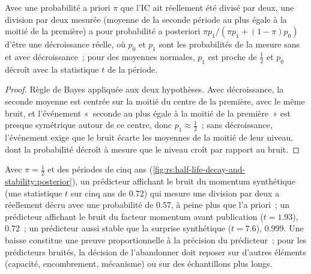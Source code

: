 \begin{proposition}\label{prop:rs:half-life-decay-and-stability:power}
Avec une probabilité a priori $\pi$ que l'IC ait réellement été divisé par deux, une division par deux mesurée (moyenne de la seconde période au plus égale à la moitié de la première) a pour probabilité a posteriori
$\pi p_1/(\pi p_1 + (1 - \pi)p_0)$ d'être une décroissance réelle, où $p_0$ et $p_1$ sont les probabilités de la mesure sans et avec décroissance~; pour des
moyennes normales, $p_1$ est proche de $\frac12$ et $p_0$ décroît avec la statistique $t$ de la période.
\end{proposition}

\begin{proof}
Règle de Bayes appliquée aux deux hypothèses. Avec décroissance, la seconde moyenne est centrée sur la moitié du centre de la première, avec le même bruit, et l'événement
«~seconde au plus égale à la moitié de la première~» est presque symétrique autour de ce centre, donc $p_1 \approx \frac12$~; sans décroissance, l'événement exige que le bruit
écarte les moyennes de la moitié de leur niveau, dont la probabilité décroît à mesure que le niveau croît par rapport au bruit.
\end{proof}

Avec $\pi = \frac12$ et des périodes de cinq ans (\cref{fig:rs:half-life-decay-and-stability:posterior}), un prédicteur affichant le bruit du momentum synthétique
(une statistique $t$ sur cinq ans de 0.72) qui mesure une division par deux a réellement décru avec une probabilité de 0.57, à peine plus que l'a priori~; un
prédicteur affichant le bruit du facteur momentum avant publication ($t = 1.93$), 0.72~; un prédicteur aussi stable que la surprise synthétique ($t = 7.6$), 0.999. Une baisse
constitue une preuve proportionnelle à la précision du prédicteur~; pour les prédicteurs bruités, la décision de l'abandonner doit reposer sur d'autres éléments (capacité, encombrement,
mécanisme) ou sur des échantillons plus longs.

